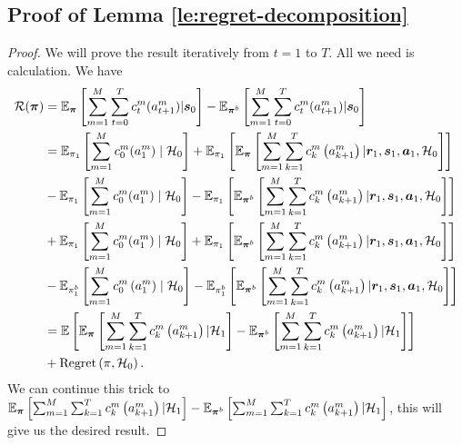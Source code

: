 \subsection{Proof of Lemma \ref{le:regret-decomposition}}
\begin{proof}
We will prove the result iteratively from $t=1$ to $T$. All we need is calculation. 
    We have
    \begin{align*}
        \mathcal{R}(\bm{\pi})&=\mathbb{E}_{\bm{\pi}}\left[\sum_{m=1}^M\sum_{t=0}^T c_t^m(a_{t+1}^m)|\bm{s}_0\right]-\mathbb{E}_{\bm{\pi}^b}\left[\sum_{m=1}^M\sum_{t=0}^T c_t^m(a_{t+1}^m)|\bm{s}_0\right]\\
        &=\mathbb{E}_{\pi_1}\left[\sum_{m=1}^M c_0^m(a_{1}^m)\mid\mathcal{H}_0\right]+\mathbb{E}_{\pi_1}\left[\mathbb{E}_{\bm{\pi}}\left[\sum_{m=1}^M\sum_{k=1}^T c_k^m\left(a_{k+1}^m\right)|\bm{r}_1,\bm{s}_1,\bm{a}_1,\mathcal{H}_0\right]\right]\\
        &-\mathbb{E}_{\pi_1}\left[\sum_{m=1}^M c_{0}^m(a_1^m)\mid\mathcal{H}_0\right]-\mathbb{E}_{\pi_1}\left[\mathbb{E}_{\bm{\pi}^b}\left[\sum_{m=1}^M\sum_{k=1}^T c_k^m\left(a_{k+1}^m\right)|\bm{r}_1,\bm{s}_1,\bm{a}_1,\mathcal{H}_0\right]\right]\\
        &+\mathbb{E}_{\pi_1}\left[\sum_{m=1}^M c_{0}^m(a_1^m)\mid\mathcal{H}_0\right]+\mathbb{E}_{\pi_1}\left[\mathbb{E}_{\bm{\pi}^b}\left[\sum_{m=1}^M\sum_{k=1}^T c_k^m\left(a_{k+1}^m\right)|\bm{r}_1, \bm{s}_1,\bm{a}_1,\mathcal{H}_0\right]\right]\\
        &-\mathbb{E}_{\pi_1^b}\left[\sum_{m=1}^M c_{0}^m\left(a_1^m\right)\mid\mathcal{H}_0\right]-\mathbb{E}_{\pi_1^b}\left[\mathbb{E}_{\bm{\pi}^b}\left[\sum_{m=1}^M\sum_{k=1}^T c_k^m\left(a_{k+1}^m\right)|\bm{r}_1,\bm{s}_1,\bm{a}_1,\mathcal{H}_0\right]\right]\\
        &=\mathbb{E}\left[\mathbb{E}_{\bm{\pi}}\left[\sum_{m=1}^M\sum_{k=1}^T c_k^m\left(a_{k+1}^m\right)|\mathcal{H}_1\right]-\mathbb{E}_{\bm{\pi}^b}\left[\sum_{m=1}^M\sum_{k=1}^T c_k^m\left(a_{k+1}^m\right)|\mathcal{H}_1\right]\right]\\
        &+\text{Regret}\left(\pi,\mathcal{H}_0\right).
    \end{align*}
    We can continue this trick to $\mathbb{E}_{\bm{\pi}}\left[\sum_{m=1}^M\sum_{k=1}^T c_k^m\left(a_{k+1}^m\right)|\mathcal{H}_1\right]-\mathbb{E}_{\bm{\pi}^b}\left[\sum_{m=1}^M\sum_{k=1}^T c_k^m\left(a_{k+1}^m\right)|\mathcal{H}_1\right]$, this will give us the desired result.
\end{proof}
